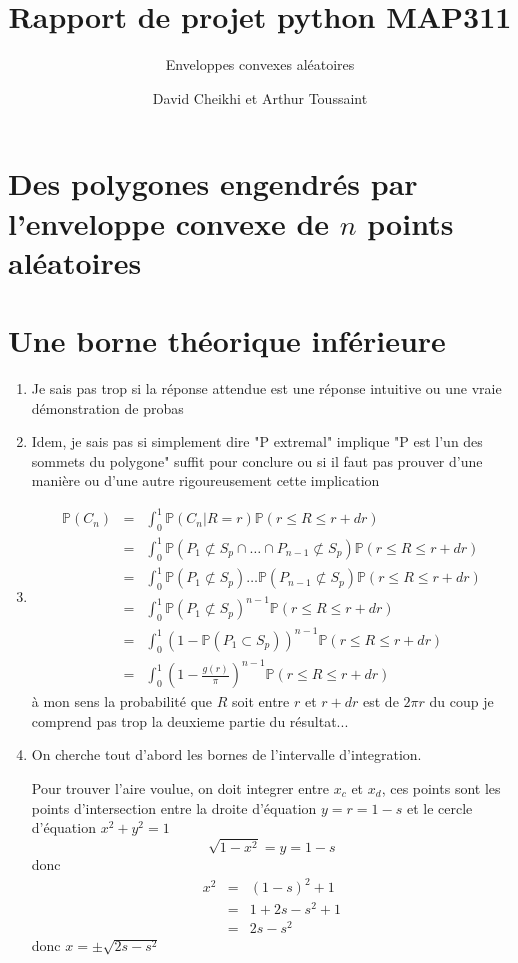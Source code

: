 \documentclass[a4paper,12pt,twoside]{article}
\title{Rapport de projet python MAP311}
\subtitle{Enveloppes convexes aléatoires}
\author{David Cheikhi et Arthur Toussaint}
\newcommand{\p}{\mathbb{P}}
\begin{document}
\maketitle

\section{Des polygones engendrés par l'enveloppe convexe de $n$ points aléatoires}
\section{Une borne théorique inférieure}
	\begin{enumerate}
		\item Je sais pas trop si la réponse attendue est une réponse intuitive ou une vraie démonstration de probas
		\item \label{extr} Idem, je sais pas si simplement dire "P extremal" implique "P est l'un des sommets du polygone" suffit pour conclure ou si il faut pas prouver d'une manière ou d'une autre rigoureusement cette implication
		\item \begin{eqnarray}
			\p(C_n) &=& \int_0^1{\p(C_n | R = r) \p(r\leq R \leq r + dr)} \\
				&=& \int_0^1{\p(P_1 \not\subset S_p \cap \ldots \cap P_{n-1} \not\subset S_p)\p(r\leq R \leq r + dr)} \\
				&=& \int_0^1{\p(P_1 \not\subset S_p) \ldots \p(P_{n-1} \not\subset S_p)\p(r\leq R \leq r + dr)} \\
				&=& \int_0^1{\p(P_1 \not\subset S_p)^{n-1}\p(r\leq R \leq r + dr)} \\
				&=& \int_0^1{(1 - \p(P_1 \subset S_p))^{n-1}\p(r\leq R \leq r + dr)} \\
				&=& \int_0^1{\left( 1 - \frac{g(r)}{\pi}\right) ^{n-1}\p(r\leq R \leq r + dr)}
		\end{eqnarray}
		à mon sens la probabilité que $R$ soit entre $r$ et $r + dr$ est de $2\pi r$ du coup je comprend pas trop la deuxieme partie du résultat...
		\item %
			On cherche tout d'abord les bornes de l'intervalle d'integration.

			Pour trouver l'aire voulue, on doit integrer entre $x_c$ et $x_d$, ces points sont les points d'intersection entre la droite d'équation $y = r = 1 - s$ et le cercle d'équation $x^2 + y^2 = 1$
			$$ \sqrt{1 - x^2} = y = 1 - s $$ donc 
			\begin{eqnarray}
				x^2	&=& (1 - s)^2 + 1\\
					&=& 1 + 2s - s^2 + 1\\
					&=& 2s - s^2
			\end{eqnarray} 
			donc $x = \pm \sqrt{2s - s^2}$


\end{enumerate}
\end{document}
